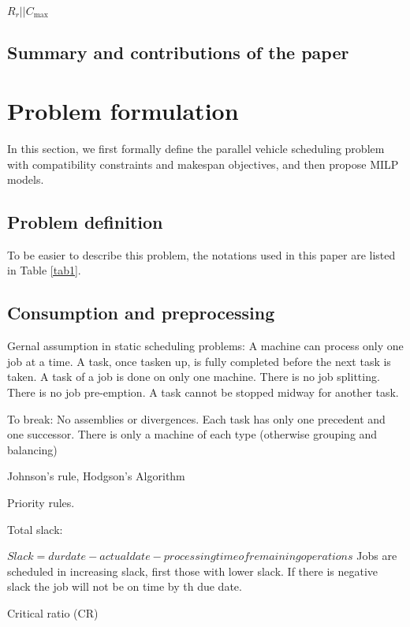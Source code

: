 \documentclass[preprint,12pt,authoryear]{elsarticle}
\begin{document}
$R_r||C_{\max}$                                                                                                                                                      

\subsection{Summary and contributions of the paper}

\section{Problem formulation}

In this section, we first formally define the parallel vehicle scheduling problem 
with compatibility constraints and makespan objectives, 
and then propose MILP models.

\subsection{Problem definition}

To be easier to describe this problem, the notations used in this paper are listed in Table \ref{tab1}.

\subsection{Consumption and preprocessing}

Gernal assumption in static scheduling problems:
A machine can process only one job at a time. 
A task, once tasken up, is fully completed before the next task is taken. 
A task of a job is done on only one machine. There is no job splitting.
There is no job pre-emption. A task cannot be stopped midway for another task. 

To break:
No assemblies or divergences. 
Each task has only one precedent and one successor.
There is only a machine of each type (otherwise grouping and balancing)

Johnson's rule, Hodgson's Algorithm

Priority rules.

Total slack: 

$Slack = dur date - actual date - processing time of remaining operations$
Jobs are scheduled in increasing slack, first those with lower slack. 
If there is negative slack the job will not be on time by th due date.

Critical ratio (CR)
\end{document}
